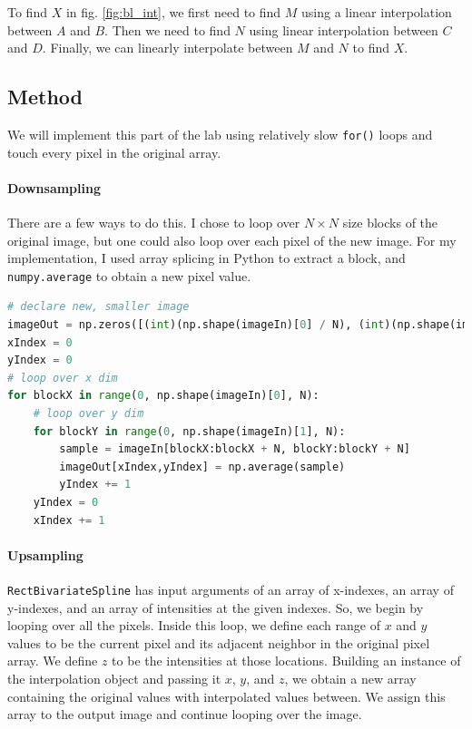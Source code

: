\documentclass[11pt,a4paper]{article}
\begin{document}
To find $X$ in fig. \ref{fig:bl_int}, we first need to find $M$ using a linear interpolation between $A$ and $B$. Then we need to find $N$ using linear interpolation between $C$ and $D$. Finally, we can linearly interpolate between $M$ and $N$ to find $X$. 

\pagebreak

\subsection{Method}
We will implement this part of the lab using relatively slow \verb|for()| loops and touch every pixel in the original array.
\paragraph{Downsampling} There are a few ways to do this. I chose to loop over $N \times N$ size blocks of the original image, but one could also loop over each pixel of the new image. For my implementation, I used array splicing in Python to extract a block, and \verb|numpy.average| to obtain a new pixel value. 

\begin{lstlisting}[language=Python]
# declare new, smaller image
imageOut = np.zeros([(int)(np.shape(imageIn)[0] / N), (int)(np.shape(imageIn)[1] / N)])
xIndex = 0
yIndex = 0
# loop over x dim
for blockX in range(0, np.shape(imageIn)[0], N):
    # loop over y dim
    for blockY in range(0, np.shape(imageIn)[1], N):
        sample = imageIn[blockX:blockX + N, blockY:blockY + N]
        imageOut[xIndex,yIndex] = np.average(sample)
        yIndex += 1
    yIndex = 0
    xIndex += 1
\end{lstlisting}

\paragraph{Upsampling}
\verb|RectBivariateSpline| has input arguments of an array of x-indexes, an array of y-indexes, and an array of intensities at the given indexes. So, we begin by looping over all the pixels. Inside this loop, we define each range of $x$ and $y$ values to be the current pixel and its adjacent neighbor in the original pixel array. We define $z$ to be the intensities at those locations. Building an instance of the interpolation object and passing it $x$, $y$, and $z$, we obtain a new array containing the original values with interpolated values between. We assign this array to the output image and continue looping over the image. 
\end{document}
